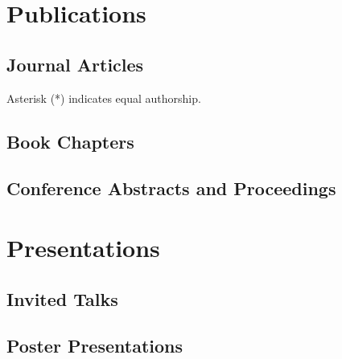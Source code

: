 \documentclass[%
]{komacv}
\begin{document}
\section{Publications}

\subsection{Journal Articles}

{\small Asterisk (*) indicates equal authorship.}

\begin{refcontext}[labelprefix=A]
\nocite{*}
\printbibliography[, keyword=article, heading=none, resetnumbers=true]
\end{refcontext}

\subsection{Book Chapters}

\begin{refcontext}[labelprefix=B]
\nocite{*}
\printbibliography[keyword=book, heading=none, resetnumbers=true]
\end{refcontext}

\subsection{Conference Abstracts and Proceedings}

\begin{refcontext}[labelprefix=C]
\nocite{*}
\printbibliography[keyword=proceeding, heading=none, resetnumbers=true]
\end{refcontext}

\section{Presentations}

\subsection{Invited Talks}

\begin{refcontext}[labelprefix=T]
\nocite{*}
\printbibliography[keyword=talk, heading=none, resetnumbers=true]
\end{refcontext}

\subsection{Poster Presentations}
\end{document}
